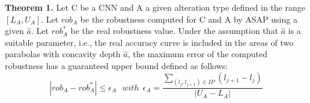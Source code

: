 \textbf{Theorem 1.} Let C be a CNN and A a given alteration type defined in the range $[L_A, U_A]$. Let $rob_A$ be the robustness computed for C and A by ASAP using a given $\hat{a}$. Let $rob_A^*$ be the real robustness value. Under the assumption that $\hat{a}$ is a suitable parameter, i.e., the real accuracy curve is included in the areas of two parabolas with concavity depth $\hat{a}$, the maximum error of the computed robustness has a guaranteed upper bound defined as follows:
\[
	|rob_A - rob_A^*| \leq \epsilon_A
	\ \ \ with \ \
	\epsilon_A = \frac{\sum_{(l_j, l_{j+1}) \in IP} (l_{j+1} - l_j)}{|U_A - L_A|}
\]